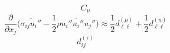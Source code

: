 \documentclass{article}
\begin{document}
\begin{equation}
C_\mu
\end{equation}
\begin{equation}
\frac{\partial}{\partial x_j}\Biggl(\overline{\sigma_{ij}u_i''}-\frac{1}{2}\overline{\rho u_i''u_i''u_j''}\Biggr)\approx\frac{1}{2}d_{\ell\ell}^{(\mu)}+\frac{1}{2}d_{\ell\ell}^{(u)}
\end{equation}
\begin{equation}
d_{ij}^{(\tau)}
\end{equation}
\end{document}
